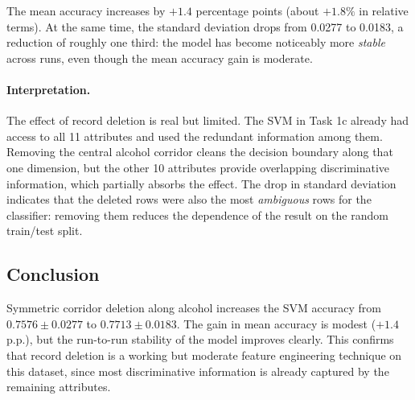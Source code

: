 The mean accuracy increases by $+1.4$ percentage points (about
$+1.8\%$ in relative terms). At the same time, the standard deviation
drops from 0.0277 to 0.0183, a reduction of roughly one third: the
model has become noticeably more \emph{stable} across runs, even
though the mean accuracy gain is moderate.

\paragraph{Interpretation.}
The effect of record deletion is real but limited. The SVM in Task 1c
already had access to all 11 attributes and used the redundant
information among them. Removing the central alcohol corridor cleans
the decision boundary along that one dimension, but the other 10
attributes provide overlapping discriminative information, which
partially absorbs the effect. The drop in standard deviation indicates
that the deleted rows were also the most \emph{ambiguous} rows for the
classifier: removing them reduces the dependence of the result on the
random train/test split.

\subsection{Conclusion}
Symmetric corridor deletion along alcohol increases the SVM accuracy
from $0.7576 \pm 0.0277$ to $0.7713 \pm 0.0183$. The gain in mean
accuracy is modest ($+1.4$ p.p.), but the run-to-run stability of the
model improves clearly. This confirms that record deletion is a
working but moderate feature engineering technique on this dataset,
since most discriminative information is already captured by the
remaining attributes.